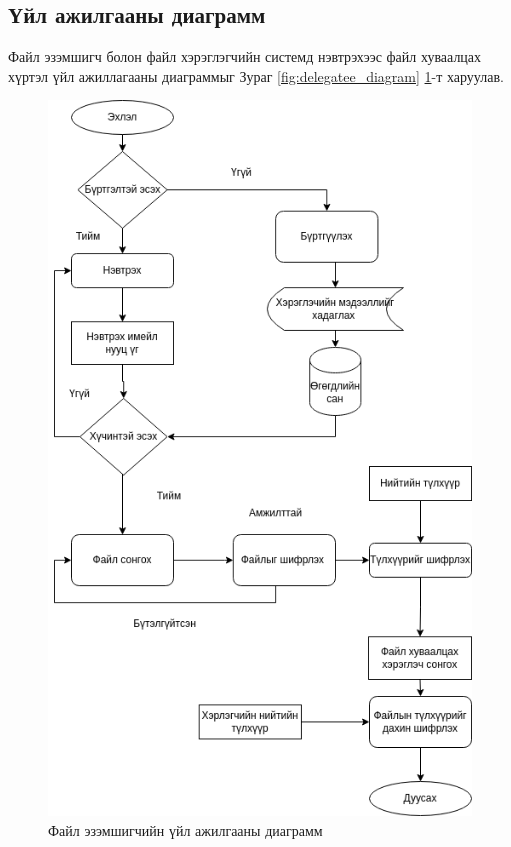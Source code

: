 \subsection*{Үйл ажилгааны диаграмм}
Файл эзэмшигч болон файл хэрэглэгчийн системд нэвтрэхээс файл хуваалцах хүртэл үйл ажиллагааны диаграммыг Зураг \ref{fig:delegatee_diagram} \ref{fig:delegator_diagram}-т харуулав.

\begin{figure}[H]
    \centering
    \includegraphics[scale=0.5]{Figures/delegator.drawio.png}
    \caption[pyUmbral]{Файл эзэмшигчийн үйл ажилгааны диаграмм}
    \label{fig:delegator_diagram}
\end{figure}

